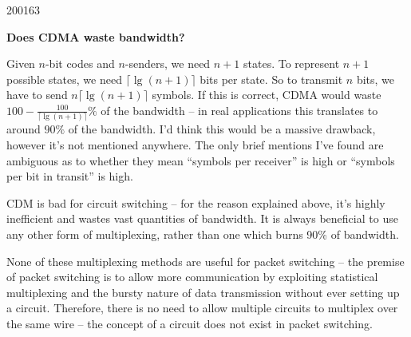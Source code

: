 \documentclass[10pt,\jkfside,a4paper]{article}
\begin{document}
\begin{examquestion}{2001}{6}{3}
\begin{enumerate}
\begin{itemize}
\textbf{Does CDMA waste bandwidth?}

Given $n$-bit codes and $n$-senders, we need $n+1$ states. To represent
$n+1$ possible states, we need $\lceil\lg(n+1)\rceil$ bits per state. So to
transmit $n$ bits, we have to send $n\lceil\lg(n+1)\rceil$ symbols.
If this is correct, CDMA would waste \\
$100 - \frac{100}{\lceil\lg(n+1)\rceil}\%$ of the bandwidth -- in
real applications this translates to around $90\%$ of the bandwidth. I'd think
this would be a massive drawback, however it's not mentioned anywhere. The
only brief mentions I've found are ambiguous as to whether they mean
``symbols per receiver'' is high or ``symbols per bit in transit'' is high.

CDM is bad for circuit switching -- for the reason explained above, it's highly
inefficient and wastes vast quantities of bandwidth. It is always beneficial
to use any other form of multiplexing, rather than one which burns 90\% of
bandwidth.

\end{itemize}

None of these multiplexing methods are useful for packet switching -- the
premise of packet switching is to allow more communication by exploiting
statistical multiplexing and the bursty nature of data transmission without
ever setting up a circuit. Therefore, there is no need to allow multiple
circuits to multiplex over the same wire -- the concept of a circuit does
not exist in packet switching.

\end{enumerate}

\end{examquestion}
\end{document}
